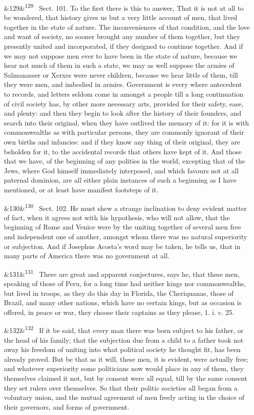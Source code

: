 \documentclass[12pt]{article}
\newcommand{\para}[1][]{\par\noindent\ifx&#1&\else\textsuperscript{\footnotesize #1}~\fi}
\begin{document}
\para[129] Sect. 101. To the first there is this to answer, That it is not at all to be wondered, that history gives us but a very little account of men, that lived together in the state of nature. The inconveniences of that condition, and the love and want of society, no sooner brought any number of them together, but they presently united and incorporated, if they designed to continue together. And if we may not suppose men ever to have been in the state of nature, because we hear not much of them in such a state, we may as well suppose the armies of Salmanasser or Xerxes were never children, because we hear little of them, till they were men, and imbodied in armies. Government is every where antecedent to records, and letters seldom come in amongst a people till a long continuation of civil society has, by other more necessary arts, provided for their safety, ease, and plenty: and then they begin to look after the history of their founders, and search into their original, when they have outlived the memory of it: for it is with commonwealths as with particular persons, they are commonly ignorant of their own births and infancies: and if they know any thing of their original, they are beholden for it, to the accidental records that others have kept of it. And those that we have, of the beginning of any polities in the world, excepting that of the Jews, where God himself immediately interposed, and which favours not at all paternal dominion, are all either plain instances of such a beginning as I have mentioned, or at least have manifest footsteps of it.

\para[130] Sect. 102. He must shew a strange inclination to deny evident matter of fact, when it agrees not with his hypothesis, who will not allow, that the beginning of Rome and Venice were by the uniting together of several men free and independent one of another, amongst whom there was no natural superiority or subjection. And if Josephus Acosta's word may be taken, he tells us, that in many parts of America there was no government at all.

\para[131] There are great and apparent conjectures, says he, that these men, speaking of those of Peru, for a long time had neither kings nor commonwealths, but lived in troops, as they do this day in Florida, the Cheriquanas, those of Brazil, and many other nations, which have no certain kings, but as occasion is offered, in peace or war, they choose their captains as they please, 1. i. c. 25.

\para[132] If it be said, that every man there was born subject to his father, or the head of his family; that the subjection due from a child to a father took not away his freedom of uniting into what political society he thought fit, has been already proved. But be that as it will, these men, it is evident, were actually free; and whatever superiority some politicians now would place in any of them, they themselves claimed it not, but by consent were all equal, till by the same consent they set rulers over themselves. So that their politic societies all began from a voluntary union, and the mutual agreement of men freely acting in the choice of their governors, and forms of government.
\end{document}
